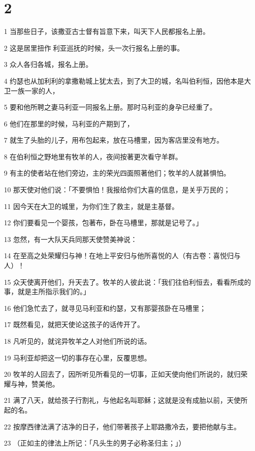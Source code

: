 \chapter{2}

\par 1 当那些日子，该撒亚古士督有旨意下来，叫天下人民都报名上册。
\par 2 这是居里扭作利亚巡抚的时候，头一次行报名上册的事。
\par 3 众人各归各城，报名上册。
\par 4 约瑟也从加利利的拿撒勒城上犹太去，到了大卫的城，名叫伯利恒，因他本是大卫一族一家的人，
\par 5 要和他所聘之妻马利亚一同报名上册。那时马利亚的身孕已经重了。
\par 6 他们在那里的时候，马利亚的产期到了，
\par 7 就生了头胎的儿子，用布包起来，放在马槽里，因为客店里没有地方。
\par 8 在伯利恒之野地里有牧羊的人，夜间按著更次看守羊群。
\par 9 有主的使者站在他们旁边，主的荣光四面照著他们；牧羊的人就甚惧怕。
\par 10 那天使对他们说：「不要惧怕！我报给你们大喜的信息，是关乎万民的；
\par 11 因今天在大卫的城里，为你们生了救主，就是主基督。
\par 12 你们要看见一个婴孩，包著布，卧在马槽里，那就是记号了。」
\par 13 忽然，有一大队天兵同那天使赞美神说：
\par 14 在至高之处荣耀归与神！在地上平安归与他所喜悦的人（有古卷：喜悦归与人）！
\par 15 众天使离开他们，升天去了。牧羊的人彼此说：「我们往伯利恒去，看看所成的事，就是主所指示我们的。」
\par 16 他们急忙去了，就寻见马利亚和约瑟，又有那婴孩卧在马槽里；
\par 17 既然看见，就把天使论这孩子的话传开了。
\par 18 凡听见的，就诧异牧羊之人对他们所说的话。
\par 19 马利亚却把这一切的事存在心里，反覆思想。
\par 20 牧羊的人回去了，因所听见所看见的一切事，正如天使向他们所说的，就归荣耀与神，赞美他。
\par 21 满了八天，就给孩子行割礼，与他起名叫耶稣；这就是没有成胎以前，天使所起的名。
\par 22 按摩西律法满了洁净的日子，他们带著孩子上耶路撒冷去，要把他献与主。
\par 23 （正如主的律法上所记：「凡头生的男子必称圣归主；」）
